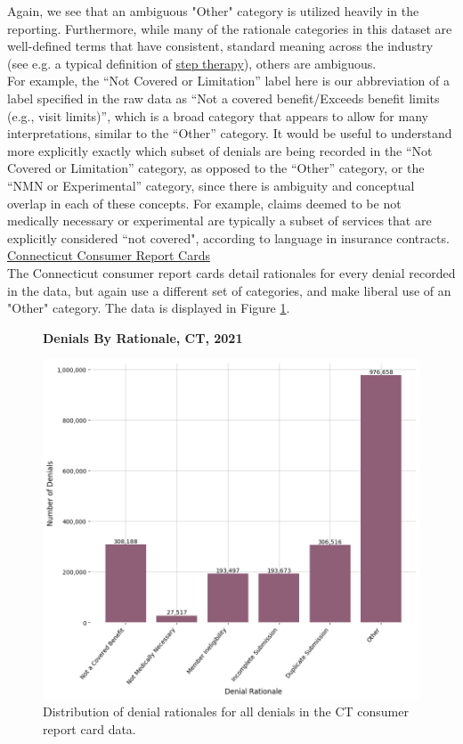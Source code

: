 \documentclass[12pt, a4paper,twoside]{report}
\theoremstyle{plain} %
\theoremstyle{definition} %
\theoremstyle{remark} %
\numberwithin{equation}{chapter}
\begin{document}
		Again, we see that an ambiguous "Other" category is utilized heavily in the reporting. Furthermore, while many of the rationale categories in this dataset are well-defined terms that have consistent, standard meaning across the industry (see e.g. a typical definition of \href{https://en.wikipedia.org/wiki/Step_therapy}{step therapy}), others are ambiguous.\\
		
		For example, the ``Not Covered or Limitation'' label here is our abbreviation of a label specified in the raw data as ``Not a covered benefit/Exceeds benefit limits (e.g., visit limits)'', which is a broad category that appears to allow for many interpretations, similar to the ``Other'' category. It would be useful to understand more explicitly exactly which subset of denials are being recorded in the ``Not Covered or Limitation'' category, as opposed to the ``Other'' category, or the ``NMN or Experimental'' category, since there is ambiguity and conceptual overlap in each of these concepts. For example, claims deemed to be not medically necessary or experimental are typically a subset of services that are explicitly considered ``not covered", according to language in insurance contracts.\\
		
		\underline{Connecticut Consumer Report Cards}\\
		
		The Connecticut consumer report cards detail rationales for every denial recorded in the data, but again use a different set of categories, and make liberal use of an "Other" category. The data is displayed in Figure \ref{ctrationaledist}.\\
		
		\begin{figure}[h!]
			\centering
			\textbf{Denials By Rationale, CT, 2021}\par\medskip
			\includegraphics[width=\columnwidth]{images/ct_claims/denials_by_rationale.png}
			\caption{Distribution of denial rationales for all denials in the CT consumer report card data. }
			\label{ctrationaledist}
		\end{figure}
		
\end{document}
